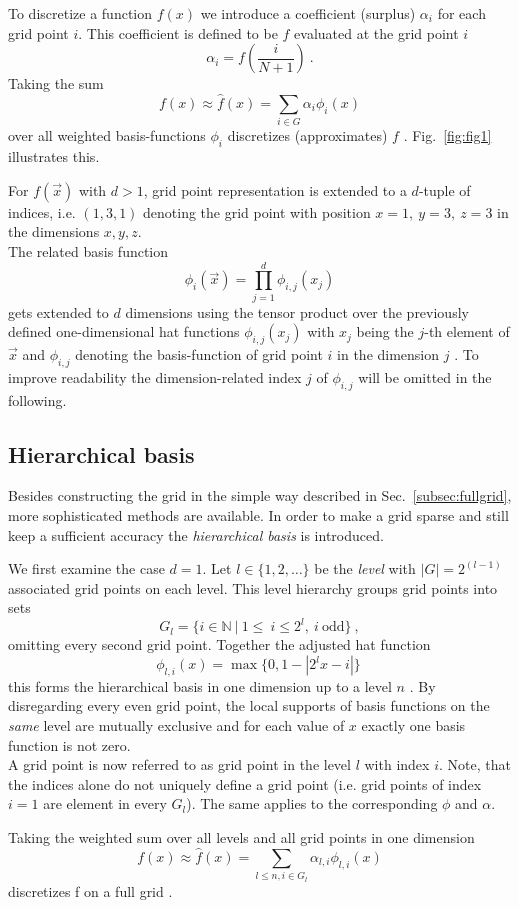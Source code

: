 \par

To discretize a function $f(x)$ we introduce a coefficient (surplus)
$\alpha_i$ for each grid point $i$. This coefficient is defined to be
$f$ evaluated at the grid point $i$
$$\alpha_i = f(\frac{i}{N+1}) \ .$$
Taking the sum
$$ f(x) \approx  \hat{f}(x) = \sum_{i \in G}{\alpha_i \phi_i(x)} $$
over all weighted basis-functions $\phi_i$ discretizes (approximates) $f$
\cite{disspfl}.
Fig.~\ref{fig:fig1} illustrates this.

\par

For $f(\vec{x})$ with $d > 1$, grid point representation is extended to
a $d$-tuple of indices, i.e. $(1,3,1)$ denoting the grid point with position
$x = 1, \ y = 3, \ z = 3$ in the dimensions $x,y,z$. \\
The related basis function
$$\phi_i(\vec{x}) = \prod_{j=1}^d{\phi_{i,j}(x_j)}$$
gets extended to $d$ dimensions using the tensor
product over the previously defined one-dimensional hat functions
$\phi_{i,j}(x_j)$ with $x_j$ being the $j$-th element of $\vec{x}$ and
$\phi_{i,j}$ denoting the basis-function of grid point $i$ in the dimension
$j$ \cite{disspfl}.
To improve readability the dimension-related index $j$ of $\phi_{i,j}$
will be omitted in the following.

\subsection{Hierarchical basis}
Besides constructing the grid in the simple way described in Sec.~\ref{subsec:fullgrid},
more sophisticated methods are available. In order to make a grid
sparse and still keep a sufficient accuracy the
\emph{hierarchical basis} is introduced.
\par
We first examine the case $d = 1$.
Let $l \in \{1,2,\dots\}$ be the \emph{level} with $|G| = 2^{(l-1)}$ associated
grid points on each level. This level hierarchy groups grid points
into sets
$$G_l = \{i \in \mathbb{N} \ | \ 1 \leq \ i \leq 2^l, \ i \ \text{odd}\} \ ,$$
omitting every second grid point. Together the adjusted hat function
$$\phi_{l,i}(x) = \max\{0, 1 - |2^lx - i|\} \ $$
this forms the hierarchical basis in one dimension up to a level $n$ 
\cite{disspfl}.
By disregarding every
even grid point, the local supports of basis functions on the \emph{same}
level are mutually exclusive and for each value of $x$ exactly one basis
function is not zero. \\
A grid point is now referred to as grid point in the level $l$ with index $i$.
Note, that the indices alone do not uniquely define a grid point (i.e. grid
points of index $i = 1$ are element in every $G_l$). The same applies to
the corresponding $\phi$ and $\alpha$.
\par
Taking the weighted sum over all levels and all grid points in one dimension
$$ f(x) \approx \hat{f}(x) =  \sum_{l \leq n, i \in G_l}{\alpha_{l,i}\phi_{l,i}(x)}$$
discretizes f on a full grid \cite{disspfl}.

